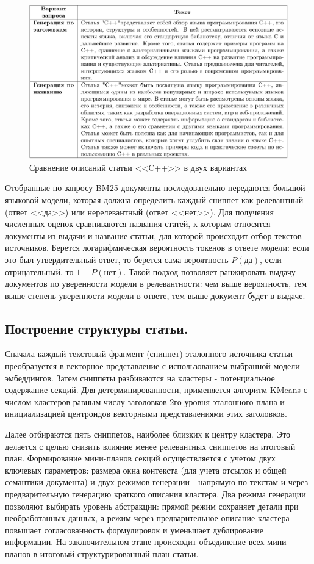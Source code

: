 \documentclass{article}
\begin{document}
\begin{figure}[ht!]
  \centering
  \includegraphics[width=\textwidth]{figures/two_queries.png}
  \caption{Сравнение описаний статьи <<C++>> в двух вариантах}
  \label{fig:cxx}
\end{figure}

Отобранные по запросу BM25 документы последовательно передаются большой языковой модели, которая должна определить каждый сниппет как релевантный (ответ <<да>>) или нерелевантный (ответ <<нет>>). 
Для получения численных оценок сравниваются названия статей, к которым относятся документы из выдачи и название статьи, для которой происходит отбор текстов-источников. 
Берется логарифмическая вероятность токенов в ответе модели: если это был утвердительный ответ, то берется сама вероятность $P(\text{да})$, если отрицательный, то $1 - P(\text{нет})$.
Такой подход позволяет ранжировать выдачу документов по уверенности модели в релевантности: чем выше вероятность, тем выше степень уверенности модели в ответе, тем выше документ будет в выдаче.

\subsection*{Построение структуры статьи.}
Сначала каждый текстовый фрагмент (сниппет) эталонного источника статьи преобразуется в векторное представление с использованием выбранной модели эмбеддингов. 
Затем сниппеты разбиваются на кластеры - потенциальное содержание секций. 
Для детерминированности, применяется алгоритм KMeans с числом кластеров равным числу заголовков 2го уровня эталонного плана и инициализацией центроидов векторными представлениями этих заголовков. 

Далее отбираются пять сниппетов, наиболее близких к центру кластера. Это делается с целью снизить влияние менее релевантных сниппетов на итоговый план. 
Формирование мини-планов секций осуществляется с учетом двух ключевых параметров: 
размера окна контекста (для учета отсылок и общей семантики документа) и двух режимов генерации - напрямую по текстам и через предварительную генерацию краткого описания кластера.
Два режима генерации позволяют выбирать уровень абстракции: 
прямой режим сохраняет детали при необработанных данных, а режим через предварительное описание кластера
повышает согласованность формулировок и уменьшает дублирование информации.
На заключительном этапе происходит объединение всех мини-планов в итоговый структурированный план статьи.
\end{document}
